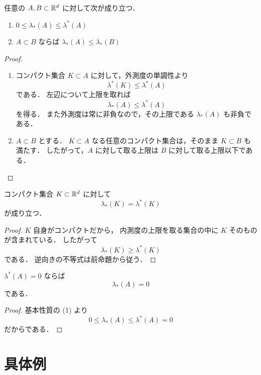 \begin{proposition} \label{prop:lebesgue-inner-basic}
任意の $A,B \subset \mathbb R^d$ に対して次が成り立つ．
\begin{enumerate}
    \item $0 \le \lambda_*(A) \le \lambda^*(A)$
    \item $A \subset B$ ならば $\lambda_*(A) \le \lambda_*(B)$
\end{enumerate}
\end{proposition}
\begin{proof}
\begin{enumerate}
    \item コンパクト集合 $K \subset A$ に対して，外測度の単調性より
    \[
    \lambda^*(K) \le \lambda^*(A)
    \]
    である．
    左辺について上限を取れば
    \[
    \lambda_*(A) \le \lambda^*(A)
    \]
    を得る．
    また外測度は常に非負なので，その上限である $\lambda_*(A)$ も非負である．

    \item $A \subset B$ とする．
    $K \subset A$ なる任意のコンパクト集合は，そのまま $K \subset B$ も満たす．
    したがって，$A$ に対して取る上限は $B$ に対して取る上限以下である．
\end{enumerate}
\end{proof}

\begin{proposition}[コンパクト集合では内外が一致する] \label{prop:compact-inner-outer-equal}
コンパクト集合 $K \subset \mathbb R^d$ に対して
\[
\lambda_*(K)=\lambda^*(K)
\]
が成り立つ．
\end{proposition}
\begin{proof}
$K$ 自身がコンパクトだから，
内測度の上限を取る集合の中に $K$ そのものが含まれている．
したがって
\[
\lambda_*(K) \ge \lambda^*(K)
\]
である．
逆向きの不等式は前命題から従う．
\end{proof}

\begin{corollary}[外測度零集合の内測度]
$\lambda^*(A)=0$ ならば
\[
\lambda_*(A)=0
\]
である．
\end{corollary}
\begin{proof}
基本性質の (1) より
\[
0 \le \lambda_*(A) \le \lambda^*(A)=0
\]
だからである．
\end{proof}


\section{具体例}

